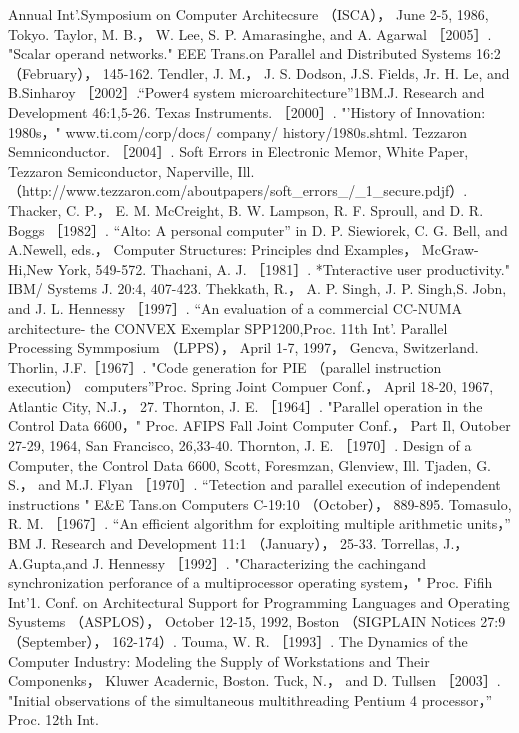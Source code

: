 Annual Int'.Symposium on Computer Architecsure （ISCA）， June 2-5, 1986, Tokyo.
Taylor, M. B.， W. Lee, S. P. Amarasinghe, and A. Agarwal ［2005］. "Scalar operand networks." EEE Trans.on Parallel and
Distributed Systems 16:2 （February）， 145-162.
Tendler, J. M.， J. S. Dodson, J.S. Fields, Jr. H. Le, and B.Sinharoy ［2002］.“Power4 system microarchitecture”1BM.J. Research
and Development 46:1,5-26.
Texas Instruments. ［2000］. "'History of Innovation: 1980s，" www.ti.com/corp/docs/ company/ history/1980s.shtml.
Tezzaron Semniconductor. ［2004］. Soft Errors in Electronic Memor, White Paper, Tezzaron Semiconductor, Naperville, Ill.
（http://www.tezzaron.com/aboutpapers/soft_errors_/_1_secure.pdjf）.
Thacker, C. P.， E. M. McCreight, B. W. Lampson, R. F. Sproull, and D. R. Boggs ［1982］.
“Alto: A personal computer” in D. P. Siewiorek, C. G. Bell, and A.Newell, eds.， Computer Structures: Principles dnd Examples，
McGraw-Hi,New York, 549-572.
Thachani, A. J. ［1981］. *Tnteractive user productivity." IBM/ Systems J. 20:4, 407-423.
Thekkath, R.， A. P. Singh, J. P. Singh,S. Jobn, and J. L. Hennessy ［1997］. “An evaluation of a commercial CC-NUMA
architecture- the CONVEX Exemplar SPP1200,Proc. 11th Int'. Parallel Processing Symmposium （LPPS）， April 1-7, 1997，
Gencva, Switzerland.
Thorlin, J.F.［1967］. "Code generation for PIE （parallel instruction execution） computers”Proc. Spring Joint Compuer Conf.，
April 18-20, 1967, Atlantic City, N.J.， 27.
Thornton, J. E. ［1964］. "Parallel operation in the Control Data 6600，" Proc. AFIPS Fall Joint Computer Conf.， Part Il, Outober
27-29, 1964, San Francisco, 26,33-40.
Thornton, J. E. ［1970］. Design of a Computer, the Control Data 6600, Scott, Foresmzan, Glenview, Ill.
Tjaden, G. S.， and M.J. Flyan ［1970］. “Tetection and parallel execution of independent instructions " E&E Tans.on Computers
C-19:10 （October）， 889-895.
Tomasulo, R. M. ［1967］. “An efficient algorithm for exploiting multiple arithmetic units，” BM J. Research and Development
11:1 （January）， 25-33.
Torrellas, J.， A.Gupta,and J. Hennessy ［1992］. "Characterizing the cachingand synchronization perforance of a multiprocessor
operating system，" Proc. Fifih Int'1. Conf. on Architectural Support for Programming Languages and Operating Syustems
（ASPLOS）， October 12-15, 1992, Boston （SIGPLAIN Notices 27:9 （September）， 162-174）.
Touma, W. R. ［1993］. The Dynamics of the Computer Industry: Modeling the Supply of Workstations and Their Componenks，
Kluwer Acadernic, Boston.
Tuck, N.， and D. Tullsen ［2003］. "Initial observations of the simultaneous multithreading Pentium 4 processor，” Proc. 12th Int.
